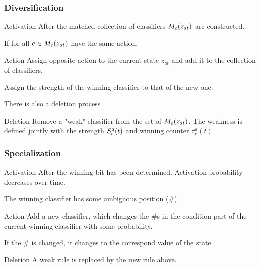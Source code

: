 \begin{frame}[allowframebreaks]
    \frametitle{Diversification}
    
    \begin{block}{Activation}
        After the matched collection of classifiers $M_e(z_{at})$ are constructed.

        If for all $e \in M_e(z_{at})$ have the same action.
    \end{block}

    \begin{block}{Action}
        Assign opposite action to the current state $z_{at}$ and add it to the 
        collection of classifiers.
        
        Assign the strength of the winning classifier to that of the new one.
    \end{block}
    \framebreak

    There is also a deletion process
    \begin{block}{Deletion}
        Remove a "weak" classifier from the set of $M_e(z_{at})$. 
        The weakness is defined jointly with the strength $S^a_e(t)$ and  winning counter $\tau_e^a(t)$ 
        
    \end{block}
\end{frame}

\begin{frame}
    \frametitle{Specialization}

    \begin{block}{Activation}
        After the winning bit has been determined. 
        Activation probability decreases over time.

        The winning classifier has some ambiguous position (\#).
    \end{block}

    \begin{block}{Action}
        Add a new classifier, which changes the \#s in the condition part of the current winning classifier
        with some probability.
        
        If the \# is changed, it changes to the correspond value of the state.
        
    \end{block}

    \begin{block}{Deletion}
        A weak rule is replaced by the new rule above.
    \end{block}

\end{frame}

